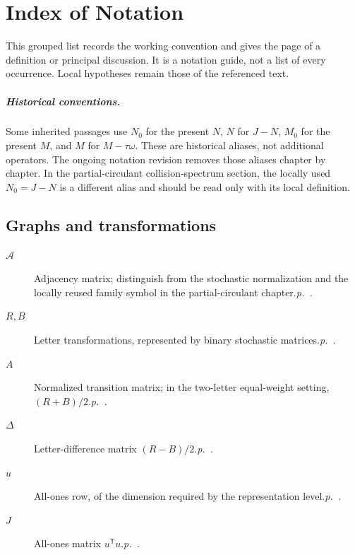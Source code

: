 \chapter*{Index of Notation}
This grouped list records the working convention and gives the page of a
definition or principal discussion. It is a notation guide, not a list of
every occurrence. Local hypotheses remain those of the referenced text.

\paragraph{Historical conventions.}
Some inherited passages use $N_0$ for the present $N$, $N$ for $J-N$,
$M_0$ for the present $M$, and $M$ for $M-\tau\omega$. These are historical
aliases, not additional operators. The ongoing notation revision removes
those aliases chapter by chapter. In the partial-circulant collision-spectrum
section, the locally used $N_0=J-N$ is a different alias and should be read
only with its local definition.

\begingroup
\newcommand{\notationentry}[3]{\item[$#1$] #2\quad\textit{p.~\pageref{#3}.}}
\section*{Graphs and transformations}
\begin{description}
\notationentry{\mathcal A}{Adjacency matrix; distinguish from the stochastic normalization and the locally reused family symbol in the partial-circulant chapter.}{defn:1}
\notationentry{R,B}{Letter transformations, represented by binary stochastic matrices.}{defn:1}
\notationentry{A}{Normalized transition matrix; in the two-letter equal-weight setting, $(R+B)/2$.}{sec:6.1}
\notationentry{\Delta}{Letter-difference matrix $(R-B)/2$.}{sec:6.1}
\notationentry{u}{All-ones row, of the dimension required by the representation level.}{sec:6.1}
\notationentry{J}{All-ones matrix $u^{\mathsf T}u$.}{sec:6.1}
\end{description}

